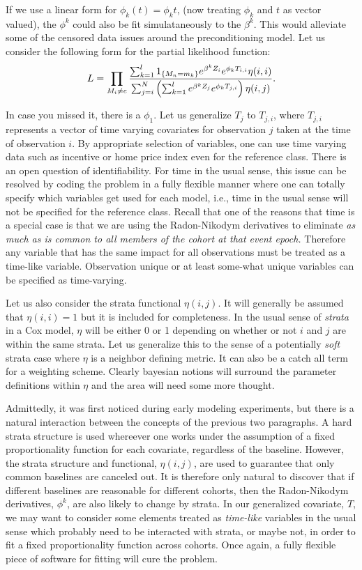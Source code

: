 \documentclass[10pt]{article}
\begin{document}
If we use a linear form for $\phi_k(t)=\phi_kt$, (now treating $\phi_k$ and $t$ as vector valued), the $\phi^k$ could also be fit simulataneously
to the $\beta^k$.  
This would alleviate some of the censored data issues around the preconditioning 
model.  Let us consider the following form for the partial likelihood function:
$$L=\prod_{M_i \not = e} {{  \sum_{k=1}^l1_{\{M_n=m_k\}}e^{\beta^kZ_i}e^{\phi_kT_{i,i}}\eta(i,i) }
\over { \sum_{j=i}^N \left({ \sum_{k=1}^le^{\beta^kZ_j}e^{\phi_kT_{j,i}} }\right)\eta(i,j) } }. $$

In case you missed it, there is a $\phi_1$.  Let us generalize $T_j$ to  $T_{j,i}$, where $T_{j,i}$ represents a vector of time varying 
covariates for observation $j$ taken at the time of observation $i$.  By appropriate selection of variables, one can use time varying data such 
as incentive or home price index even for the reference class.  There is 
an open question of identifiability. For time in the usual sense, this issue can be resolved by coding the problem in a fully flexible manner where one 
can totally specify which variables get used for each model, i.e., time in the usual sense will not be specified for the reference class.
Recall that one of the reasons that time is a special case is that we are using the Radon-Nikodym derivatives to eliminate {\em as much as is common 
to all members of the cohort at that event epoch.}  Therefore any variable that has the same impact for all observations must be 
treated as a time-like variable.  Observation unique or at least some-what unique variables can be specified as time-varying.


Let us also consider the strata functional $\eta(i,j)$.  It will generally be assumed that $\eta(i,i)=1$ but it is included for completeness.
In the usual sense of {\em strata} in a Cox model, $\eta$ will be either 0 or 1 depending on whether or not $i$ and $j$ are within the same strata.
Let us generalize this to the sense of a potentially {\em soft} strata case where $\eta$ is a neighbor defining metric.  It can also be a catch all
term for a weighting scheme.  Clearly bayesian notions will surround the parameter definitions within $\eta$ and the area will need some more 
thought.


Admittedly, it was first noticed during early modeling experiments, but there is a natural interaction between the concepts of the previous two
paragraphs.  A hard strata structure is used whereever one works under the assumption of a fixed proportionality function for each covariate, regardless 
of the baseline. However, the strata structure and functional, $\eta(i,j)$, are used to guarantee that only common baselines are canceled out. 
It is therefore only natural to discover that if different baselines are reasonable for different cohorts, then the Radon-Nikodym derivatives,
$\phi^k$, are also likely to change by strata.  In our generalized covariate, $T$, we may want to consider some elements treated as {\em time-like} variables 
in the usual sense which probably need to be interacted with strata, or maybe not, in order to fit a fixed proportionality function across 
cohorts.  Once again, a fully flexible piece of software for fitting will cure the problem.
\end{document}
